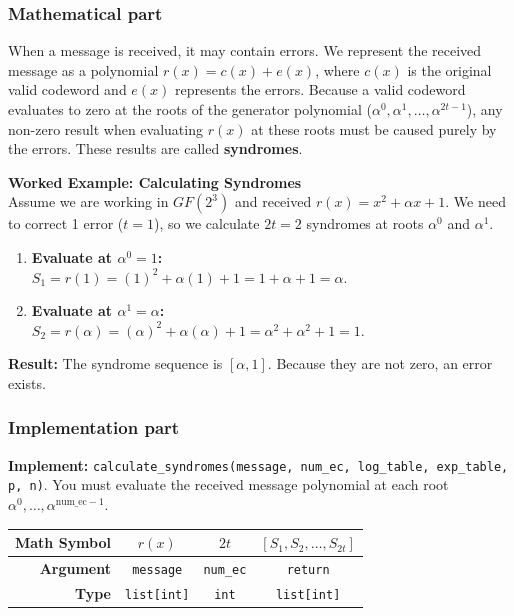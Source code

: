 \documentclass[11pt]{article}
\begin{document}
\subsubsection*{Mathematical part}
When a message is received, it may contain errors. We represent the received message as a polynomial $r(x) = c(x) + e(x)$, where $c(x)$ is the original valid codeword and $e(x)$ represents the errors. Because a valid codeword evaluates to zero at the roots of the generator polynomial ($\alpha^0, \alpha^1, \dots, \alpha^{2t-1}$), any non-zero result when evaluating $r(x)$ at these roots must be caused purely by the errors. These results are called \textbf{syndromes}.

\textbf{Worked Example: Calculating Syndromes} \\
Assume we are working in $GF(2^3)$ and received $r(x) = x^2 + \alpha x + 1$. We need to correct 1 error ($t=1$), so we calculate $2t=2$ syndromes at roots $\alpha^0$ and $\alpha^1$.
\begin{enumerate}
    \item \textbf{Evaluate at $\alpha^0 = 1$:} \\
    $S_1 = r(1) = (1)^2 + \alpha(1) + 1 = 1 + \alpha + 1 = \alpha$.
    \item \textbf{Evaluate at $\alpha^1 = \alpha$:} \\
    $S_2 = r(\alpha) = (\alpha)^2 + \alpha(\alpha) + 1 = \alpha^2 + \alpha^2 + 1 = 1$.
\end{enumerate}
\textbf{Result:} The syndrome sequence is $[\alpha, 1]$. Because they are not zero, an error exists.

\subsubsection*{Implementation part}
\textbf{Implement:} \lstinline|calculate_syndromes(message, num_ec, log_table, exp_table, p, n)|. You must evaluate the received message polynomial at each root $\alpha^0, \dots, \alpha^{\text{num\_ec}-1}$.

\begin{center}
\renewcommand{\arraystretch}{2.0}
\begin{tabular}{r | c | c | c }
\toprule
\textbf{Math Symbol} & $r(x)$ & $2t$ & $[S_1, S_2, \dots, S_{2t}]$ \\ \midrule
\textbf{Argument} & \lstinline|message| & \lstinline|num_ec| & \lstinline|return| \\ \midrule
\textbf{Type} & \lstinline|list[int]| & \lstinline|int| & \lstinline|list[int]| \\
\bottomrule
\end{tabular}
\end{center}
\end{document}
